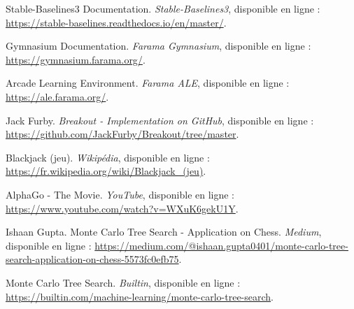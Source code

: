 \documentclass{article}
\begin{document}
\begin{thebibliography}{9}

Stable-Baselines3 Documentation. \textit{Stable-Baselines3}, disponible en ligne :
\url{https://stable-baselines.readthedocs.io/en/master/}.

Gymnasium Documentation. \textit{Farama Gymnasium}, disponible en ligne :
\url{https://gymnasium.farama.org/}.

Arcade Learning Environment. \textit{Farama ALE}, disponible en ligne :
\url{https://ale.farama.org/}.

Jack Furby. \textit{Breakout - Implementation on GitHub}, disponible en ligne :
\url{https://github.com/JackFurby/Breakout/tree/master}.

Blackjack (jeu). \textit{Wikipédia}, disponible en ligne :
\url{https://fr.wikipedia.org/wiki/Blackjack_(jeu)}.

AlphaGo - The Movie. \textit{YouTube}, disponible en ligne :
\url{https://www.youtube.com/watch?v=WXuK6gekU1Y}.

Ishaan Gupta. Monte Carlo Tree Search - Application on Chess. \textit{Medium}, disponible en ligne :
\url{https://medium.com/@ishaan.gupta0401/monte-carlo-tree-search-application-on-chess-5573fc0efb75}.

Monte Carlo Tree Search. \textit{Builtin}, disponible en ligne :
\url{https://builtin.com/machine-learning/monte-carlo-tree-search}.

\end{thebibliography}
\end{document}
